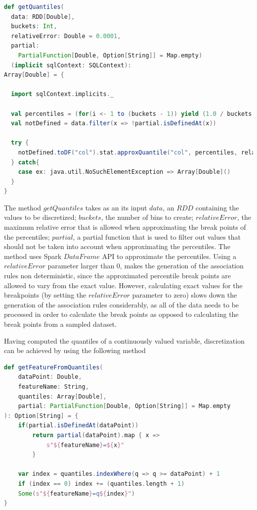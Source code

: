 \begin{minipage}{0.95\linewidth}
\begin{lstlisting}[language=scala] 
def getQuantiles(
  data: RDD[Double],
  buckets: Int,
  relativeError: Double = 0.0001,
  partial: 
  	PartialFunction[Double, Option[String]] = Map.empty)
  (implicit sqlContext: SQLContext): 
Array[Double] = {
	
  import sqlContext.implicits._

  val percentiles = (for(i <- 1 to (buckets - 1)) yield (1.0 / buckets) * i).toArray
  val notDefined = data.filter(x => !partial.isDefinedAt(x))

  try {
    notDefined.toDF("col").stat.approxQuantile("col", percentiles, relativeError)
  } catch{
    case ex: java.util.NoSuchElementException => Array[Double]()
  }
}
\end{lstlisting}
\end{minipage}  

The method $getQuantiles$ takes as an its input $data$, an $RDD$ containing the values to be discretized; $buckets$, the number of bins to create; $relativeError$, the maximum relative error that is allowed when approximating the break points of the percentiles; $partial$, a partial function that is used to filter out values that should not be taken into account when approximating the percentiles. The method uses Spark $DataFrame$ API to approximate the percentiles. Using a $relativeError$ parameter larger than 0, makes the generation of the association rules non deterministic, since the approximated percentile break points are allowed to vary from the exact value. However, calculating exact values for the breakpoints (by setting the $relativeError$ parameter to zero) slows down the generation of the association rules considerably, as all of the data needs to be processed in order to calculate the break points as opposed to calculating the break points from a sampled dataset.

Having computed the quantiles of a continuously valued variable, discretization can be achieved by using the following method

\begin{minipage}{0.95\linewidth}
\begin{lstlisting}[language=scala] 
def getFeatureFromQuantiles(
	dataPoint: Double,
	featureName: String,
	quantiles: Array[Double],
	partial: PartialFunction[Double, Option[String]] = Map.empty
): Option[String] = {
	if(partial.isDefinedAt(dataPoint))
		return partial(dataPoint).map { x => 
			s"${featureName}=${x}"
		}
	
	var index = quantiles.indexWhere(q => q >= dataPoint) + 1	
	if (index == 0) index += (quantiles.length + 1)
	Some(s"${featureName}=q${index}")
}  
\end{lstlisting}
\end{minipage}  


